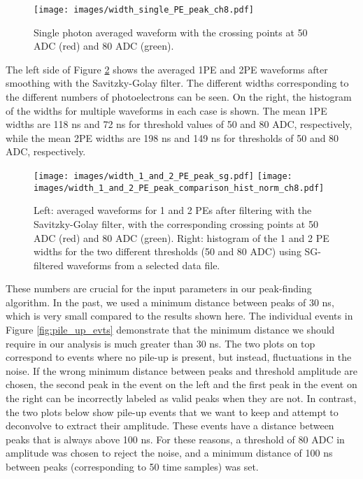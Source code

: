 \documentclass[11pt,a4paper,english,oneside, pdf]{article}
\begin{document}
	\begin{figure}[!h]
		\begin{center}
			\texttt{[image: images/width\_single\_PE\_peak\_ch8.pdf]}
			\caption{Single photon averaged waveform with the crossing points at 50 ADC (red) and 80 ADC (green).}
			\label{fig:width_1PE_signal}
		\end{center}
	\end{figure}
	
	The left side of Figure \ref{fig:width_1_and_2_PE} shows the averaged 1PE and 2PE waveforms after smoothing with the Savitzky-Golay filter. The different widths corresponding to the different numbers of photoelectrons can be seen. On the right, the histogram of the widths for multiple waveforms in each case is shown. The mean 1PE widths are 118 ns and 72 ns for threshold values of 50 and 80 ADC, respectively, while the mean 2PE widths are 198 ns and 149 ns for thresholds of 50 and 80 ADC, respectively.
	
	\begin{figure}[!h]
		\begin{center}
			\texttt{[image: images/width\_1\_and\_2\_PE\_peak\_sg.pdf]}
			\texttt{[image: images/width\_1\_and\_2\_PE\_peak\_comparison\_hist\_norm\_ch8.pdf]}
			\caption{Left: averaged waveforms for 1 and 2 PEs after filtering with the Savitzky-Golay filter, with the corresponding crossing points at 50 ADC (red) and 80 ADC (green). Right: histogram of the 1 and 2 PE widths for the two different thresholds (50 and 80 ADC) using SG-filtered waveforms from a selected data file.}
			\label{fig:width_1_and_2_PE}
		\end{center}
	\end{figure}
	
	These numbers are crucial for the input parameters in our peak-finding algorithm. In the past, we used a minimum distance between peaks of 30 ns, which is very small compared to the results shown here. The individual events in Figure \ref{fig:pile_up_evts} demonstrate that the minimum distance we should require in our analysis is much greater than 30 ns. The two plots on top correspond to events where no pile-up is present, but instead, fluctuations in the noise. If the wrong minimum distance between peaks and threshold amplitude are chosen, the second peak in the event on the left and the first peak in the event on the right can be incorrectly labeled as valid peaks when they are not. In contrast, the two plots below show pile-up events that we want to keep and attempt to deconvolve to extract their amplitude. These events have a distance between peaks that is always above 100 ns. For these reasons, a threshold of 80 ADC in amplitude was chosen to reject the noise, and a minimum distance of 100 ns between peaks (corresponding to 50 time samples) was set.
	
\end{document}
